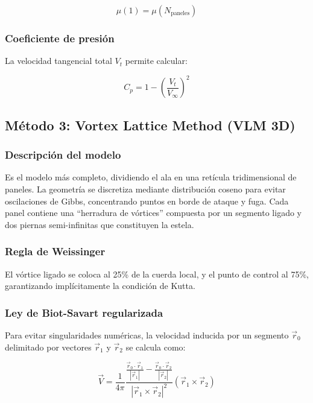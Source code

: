 \documentclass[twocolumn]{article}
\begin{document}
\begin{equation}
\mu(1) = \mu(N_{\text{paneles}})
\end{equation}

\subsubsection{Coeficiente de presión}
La velocidad tangencial total $V_t$ permite calcular:

\begin{equation}
C_p = 1 - \left(\frac{V_t}{V_{\infty}}\right)^2
\end{equation}

\subsection{Método 3: Vortex Lattice Method (VLM 3D)}

\subsubsection{Descripción del modelo}
Es el modelo más completo, dividiendo el ala en una retícula tridimensional de paneles. La geometría se discretiza mediante distribución coseno para evitar oscilaciones de Gibbs, concentrando puntos en borde de ataque y fuga. Cada panel contiene una ``herradura de vórtices'' compuesta por un segmento ligado y dos piernas semi-infinitas que constituyen la estela.

\subsubsection{Regla de Weissinger}
El vórtice ligado se coloca al 25\% de la cuerda local, y el punto de control al 75\%, garantizando implícitamente la condición de Kutta.

\subsubsection{Ley de Biot-Savart regularizada}
Para evitar singularidades numéricas, la velocidad inducida por un segmento $\vec{r}_0$ delimitado por vectores $\vec{r}_1$ y $\vec{r}_2$ se calcula como:

\begin{equation}
\vec{V} = \frac{1}{4\pi} \frac{\frac{\vec{r}_0 \cdot \vec{r}_1}{|\vec{r}_1|} - \frac{\vec{r}_0 \cdot \vec{r}_2}{|\vec{r}_2|}}{|\vec{r}_1 \times \vec{r}_2|^2} (\vec{r}_1 \times \vec{r}_2)
\end{equation}
\end{document}
